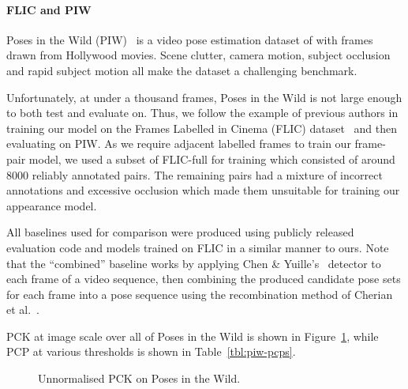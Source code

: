 \documentclass[runningheads]{llncs}
\begin{document}
\paragraph{FLIC and PIW} Poses in the Wild (PIW)~\cite{cherian2014mixing} is a
video pose estimation dataset of with frames drawn from Hollywood movies. Scene
clutter, camera motion, subject occlusion and rapid subject motion all make the
dataset a challenging benchmark.

Unfortunately, at under a thousand frames, Poses in the Wild is not large enough
to both test and evaluate on. Thus, we follow the example of previous authors in
training our model on the Frames Labelled in Cinema (FLIC)
dataset~\cite{sapp2013modec} and then evaluating on PIW\@. As we require
adjacent labelled frames to train our frame-pair model, we used a subset of
FLIC-full for training which consisted of around 8000 reliably annotated pairs.
The remaining pairs had a mixture of incorrect annotations and excessive
occlusion which made them unsuitable for training our appearance model.

All baselines used for comparison were produced using publicly released
evaluation code and models trained on FLIC in a similar manner to ours. Note
that the ``combined'' baseline works by applying Chen \&
Yuille's~\cite{chen2014articulated} detector to each frame of a video sequence,
then combining the produced candidate pose sets for each frame into a pose
sequence using the recombination method of Cherian et
al.~\cite{cherian2014mixing}.

PCK at image scale over all of Poses in the Wild is shown in
Figure~\ref{fig:piw-pcks}, while PCP at various thresholds is shown in
Table~\ref{tbl:piw-pcps}.

\begin{figure}[t]
\begin{center}

\end{center}
\vspace{-5mm}
\caption{Unnormalised PCK on Poses in the Wild.}
\label{fig:piw-pcks}
\end{figure}
\end{document}
